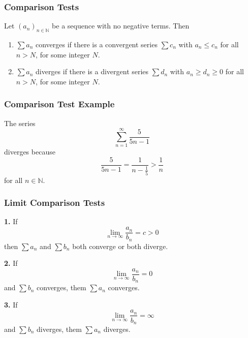 \documentclass[xcolor=dvipsnames]{beamer}
\begin{document}
\begin{frame}
  \frametitle{Comparison Tests}
  Let $\left(a_{n}\right)_{n\in\mathbb{N}}$ be a sequence with no
  negative terms. Then
  \begin{enumerate}
  \item $\sum{}a_{n}$ converges if there is a convergent series
    $\sum{}c_{n}$ with $a_{n}\leq{}c_{n}$ for all $n>N$, for some
    integer $N$.
  \item $\sum{}a_{n}$ diverges if there is a divergent series
    $\sum{}d_{n}$ with $a_{n}\geq{}d_{n}\geq{}0$ for all $n>N$,
    for some integer $N$.
  \end{enumerate}
\end{frame}

\begin{frame}
  \frametitle{Comparison Test Example}
   The series
  \begin{equation}
    \label{eq:oopoosoo}
    \sum_{n=1}^{\infty}\frac{5}{5n-1}
  \end{equation}
  diverges because
  \begin{equation}
    \label{eq:quaejash}
    \frac{5}{5n-1}=\frac{1}{n-\frac{1}{5}}>\frac{1}{n}
  \end{equation}
for all $n\in\mathbb{N}$.
\end{frame}

\begin{frame}
  \frametitle{Limit Comparison Tests}
  \textbf{1.} If
  \begin{equation}
    \label{eq:eaquaish}
    \lim_{n\rightarrow\infty}\frac{a_{n}}{b_{n}}=c>0
  \end{equation}
then $\sum{}a_{n}$ and $\sum{}b_{n}$ both converge or both
diverge.

\bigskip

  \textbf{2.} If
  \begin{equation}
    \label{eq:ejeixuaj}
    \lim_{n\rightarrow\infty}\frac{a_{n}}{b_{n}}=0
  \end{equation}
and $\sum{}b_{n}$ converges, them $\sum{}a_{n}$ converges.

\bigskip

  \textbf{3.} If
  \begin{equation}
    \label{eq:aeteiroh}
    \lim_{n\rightarrow\infty}\frac{a_{n}}{b_{n}}=\infty
  \end{equation}
and $\sum{}b_{n}$ diverges, them $\sum{}a_{n}$ diverges.
\end{frame}
\end{document}
